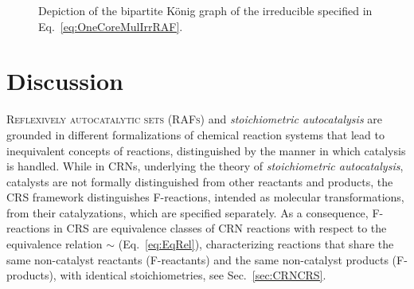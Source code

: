 \documentclass[pdflatex]{sn-jnl}
\theoremstyle{thmstyleone}%
\theoremstyle{examplesty}%
\theoremstyle{thmstylethree}%
\begin{document}
\begin{figure}[htb]
	\centering
	\caption{Depiction of the bipartite K\"onig graph of the irreducible specified in Eq.~\eqref{eq:OneCoreMulIrrRAF}.}
	\label{fig:OneCoreMulIrrRAF}
\end{figure}

\section{Discussion}

\textsc{Reflexively autocatalytic sets (RAFs)} and \emph{stoichiometric
  autocatalysis} are grounded in different formalizations of chemical
reaction systems that lead to inequivalent concepts of reactions,
distinguished by the manner in which catalysis is handled. While in CRNs,
underlying the theory of \emph{stoichiometric autocatalysis}, catalysts are
not formally distinguished from other reactants and products, the CRS 
framework distinguishes F-reactions, intended as molecular transformations, 
from their catalyzations, which are specified separately. As a
consequence, F-reactions in CRS are equivalence classes of CRN reactions with
respect to the equivalence relation $\sim$ (Eq.~\eqref{eq:EqRel}),
characterizing reactions that share the same non-catalyst reactants
(F-reactants) and the same non-catalyst products (F-products), with
identical stoichiometries, see Sec.~\ref{sec:CRNCRS}.
\end{document}
